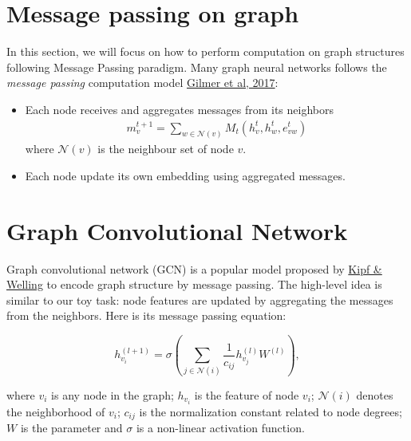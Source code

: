 \section{Message passing on graph}
 In this section, we will focus on how to perform computation on graph structures following Message Passing paradigm. Many graph neural networks follows the \textit{message passing} computation model \href{https://arxiv.org/abs/1704.01212}{Gilmer et al, 2017}:
\begin{itemize}
    \item Each node receives and aggregates messages from its neighbors  
\begin{gather}
m_v^{t+1} = \sum\limits_{w\in \mathcal{N}(v)}M_t(h_v^t, h_w^t, e_{vw}^t)
\end{gather}
where $\mathcal{N}(v)$ is the neighbour set of node $v$.

\item Each node update its own embedding using aggregated messages.
\end{itemize}




\section{Graph Convolutional Network}

Graph convolutional network (GCN) is a popular model proposed by \href{https://arxiv.org/abs/1609.02907}{Kipf \& Welling} to encode graph structure by message passing. The high-level idea is similar to our toy task: node features are updated by aggregating the messages from the neighbors. Here is its message passing equation:

$$
h_{v_i}^{(l+1)} = \sigma \left(\sum_{j\in\mathcal{N}(i)}\frac{1}{c_{ij}}h_{v_j}^{(l)}W^{(l)} \right),
$$

where $v_i$ is any node in the graph; $h_{v_i}$ is the feature of node $v_i$; $\mathcal{N}(i)$ denotes the neighborhood of $v_i$; $c_{ij}$ is the normalization constant related to node degrees; $W$ is the parameter and $\sigma$ is a non-linear activation function.
